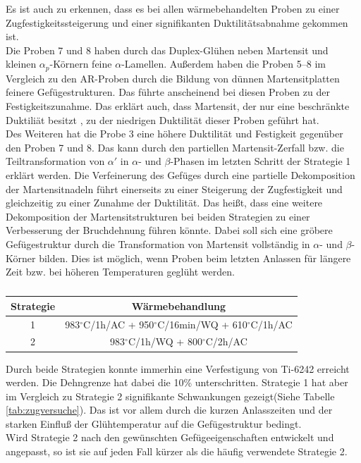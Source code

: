 Es ist auch zu erkennen, dass es bei allen wärmebehandelten Proben zu einer Zugfestigkeitssteigerung und einer signifikanten Duktilitätsabnahme gekommen ist.\\
Die Proben 7 und 8 haben durch das Duplex-Glühen neben Martensit und kleinen $\alpha_p$-Körnern feine $\alpha$-Lamellen. Außerdem haben die Proben 5--8 im Vergleich zu den AR-Proben durch die Bildung von  dünnen Martensitplatten feinere Gefügestrukturen. Das führte anscheinend bei diesen Proben zu der Festigkeitszunahme. Das erklärt auch, dass Martensit, der nur eine beschränkte Duktiliät besitzt \cite{Lutjering.2007}, zu der niedrigen Duktilität dieser Proben geführt hat.\\
Des Weiteren hat die Probe 3 eine höhere Duktilität und Festigkeit gegenüber den Proben 7 und 8. Das kann durch den partiellen Martensit-Zerfall bzw. die Teiltransformation von $\alpha'$ in $\alpha$- und $\beta$-Phasen im letzten Schritt der Strategie 1 erklärt werden. Die Verfeinerung des Gefüges durch eine partielle Dekomposition der Martensitnadeln führt einerseits zu einer Steigerung der  Zugfestigkeit  und gleichzeitig zu einer Zunahme der Duktilität. 
Das heißt, dass eine weitere Dekomposition der Martensitstrukturen bei beiden Strategien zu einer Verbesserung der Bruchdehnung führen könnte. Dabei soll sich eine gröbere Gefügestruktur durch die Transformation von Martensit vollständig in $\alpha$- und $\beta$-Körner bilden. Dies ist möglich, wenn Proben beim letzten Anlassen für längere Zeit bzw. bei höheren Temperaturen geglüht werden.



\begin{table}[h]
	\centering
	\begin{tabular}{|c|c|}
		\hline 
		Strategie & Wärmebehandlung \\ 
		\hline 
		1 & 983$^\circ$C/1h/AC + 950$^\circ$C/16min/WQ + 610$^\circ$C/1h/AC\\ 
		\hline 
		2 &  983$^\circ$C/1h/WQ + 800$^\circ$C/2h/AC \\ 
		\hline 
	\end{tabular} 
	\caption{}
	\label{wBZ}
	
	
\end{table}

Durch beide Strategien konnte immerhin  eine Verfestigung von Ti-6242 erreicht werden. Die Dehngrenze hat dabei  die 10\% unterschritten. Strategie 1 hat aber im Vergleich zu Strategie 2 signifikante Schwankungen gezeigt(Siehe Tabelle \ref{tab:zugversuche}). Das ist vor allem durch die kurzen Anlasszeiten und der starken Einfluß der Glühtemperatur auf die Gefügestruktur bedingt. \\
Wird Strategie 2  nach den gewünschten Gefügeeigenschaften entwickelt und angepasst, so ist sie auf jeden Fall kürzer als die häufig verwendete Strategie 2.













